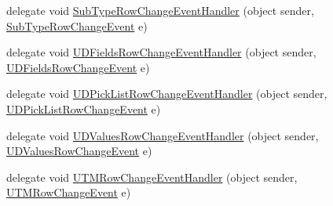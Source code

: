 \begin{DoxyCompactItemize}
delegate void \hyperlink{class_env_int_1_1_win32_1_1_field_tech_1_1_manager_1_1_data_sets_1_1_guide_ware_mobile_data_set_a1ba1e2549acaf1c86c08a0e9ca5e836f}{Sub\+Type\+Row\+Change\+Event\+Handler} (object sender, \hyperlink{class_env_int_1_1_win32_1_1_field_tech_1_1_manager_1_1_data_sets_1_1_guide_ware_mobile_data_set_1_1_sub_type_row_change_event}{Sub\+Type\+Row\+Change\+Event} e)
\item 
delegate void \hyperlink{class_env_int_1_1_win32_1_1_field_tech_1_1_manager_1_1_data_sets_1_1_guide_ware_mobile_data_set_a57a79313243866b76d7161614d0382a7}{U\+D\+Fields\+Row\+Change\+Event\+Handler} (object sender, \hyperlink{class_env_int_1_1_win32_1_1_field_tech_1_1_manager_1_1_data_sets_1_1_guide_ware_mobile_data_set_1_1_u_d_fields_row_change_event}{U\+D\+Fields\+Row\+Change\+Event} e)
\item 
delegate void \hyperlink{class_env_int_1_1_win32_1_1_field_tech_1_1_manager_1_1_data_sets_1_1_guide_ware_mobile_data_set_a89db01e03da1252fbc81b1c724a9662c}{U\+D\+Pick\+List\+Row\+Change\+Event\+Handler} (object sender, \hyperlink{class_env_int_1_1_win32_1_1_field_tech_1_1_manager_1_1_data_sets_1_1_guide_ware_mobile_data_set_a32762a7487696410a34ea07d27caf21}{U\+D\+Pick\+List\+Row\+Change\+Event} e)
\item 
delegate void \hyperlink{class_env_int_1_1_win32_1_1_field_tech_1_1_manager_1_1_data_sets_1_1_guide_ware_mobile_data_set_a762a39b6cc28c857aeac9dba9d7dfe11}{U\+D\+Values\+Row\+Change\+Event\+Handler} (object sender, \hyperlink{class_env_int_1_1_win32_1_1_field_tech_1_1_manager_1_1_data_sets_1_1_guide_ware_mobile_data_set_1_1_u_d_values_row_change_event}{U\+D\+Values\+Row\+Change\+Event} e)
\item 
delegate void \hyperlink{class_env_int_1_1_win32_1_1_field_tech_1_1_manager_1_1_data_sets_1_1_guide_ware_mobile_data_set_af15181f84aa3cca3b3d0445b6ba6e836}{U\+T\+M\+Row\+Change\+Event\+Handler} (object sender, \hyperlink{class_env_int_1_1_win32_1_1_field_tech_1_1_manager_1_1_data_sets_1_1_guide_ware_mobile_data_set_1_1_u_t_m_row_change_event}{U\+T\+M\+Row\+Change\+Event} e)
\end{DoxyCompactItemize}
